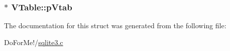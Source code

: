 \hypertarget{struct_v_table_ae15b9cb002c013019dcbac919bda9ac8}{
\subsubsection[{p\-Vtab}]{$\ast$ V\-Table\-::p\-Vtab}}\label{struct_v_table_ae15b9cb002c013019dcbac919bda9ac8}


The documentation for this struct was generated from the following file\-:\begin{DoxyCompactItemize}
\item 
Do\-For\-Me!/\hyperlink{sqlite3_8c}{sqlite3.\-c}\end{DoxyCompactItemize}
